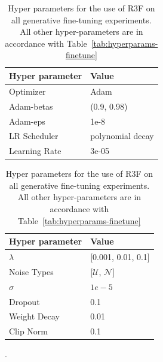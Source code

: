 \documentclass{article} %
\begin{document}
\begin{table}[h]
\centering
\begin{tabular}{@{}ll@{}}
\toprule
Hyper parameter & Value              \\ \midrule
Optimizer       & Adam               \\
Adam-betas      & (0.9, 0.98)        \\
Adam-eps        & 1e-8               \\
LR Scheduler    & polynomial decay   \\
Learning Rate   & 3e-05              \\

\bottomrule
\end{tabular}
\quad
\begin{tabular}{@{}ll@{}}
\toprule
Hyper parameter & Value           \\ \midrule
$\lambda$          & [0.001, 0.01, 0.1] \\
Noise Types     & [$\mathcal{U}$, $\mathcal{N}$] \\
$\sigma$        & $1e-5$\\ 
Dropout         & 0.1                \\
Weight Decay    & 0.01               \\
Clip Norm       & 0.1                \\
\bottomrule
\end{tabular}
\caption{Hyper parameters for the use of R3F on all generative fine-tuning experiments. All other hyper-parameters are in accordance with Table~\ref{tab:hyperparams-finetune}}
\label{tab:hyperparams-generative}.
\end{table}
\end{document}
